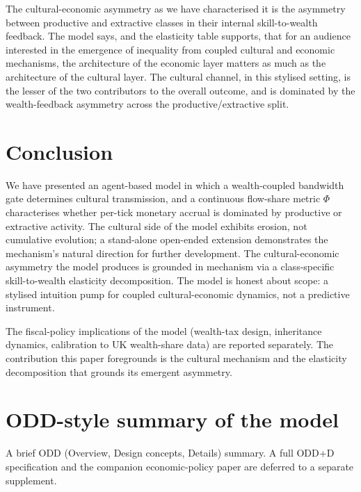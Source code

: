\documentclass[11pt]{article}
\begin{document}
The cultural-economic asymmetry as we have characterised it is the
asymmetry between productive and extractive classes in their
internal skill-to-wealth feedback. The model says, and the
elasticity table supports, that for an audience interested in the
emergence of inequality from coupled cultural and economic
mechanisms, the architecture of the economic layer matters as much
as the architecture of the cultural layer. The cultural channel,
in this stylised setting, is the lesser of the two contributors to
the overall outcome, and is dominated by the wealth-feedback
asymmetry across the productive/extractive split.

\section{Conclusion}

We have presented an agent-based model in which a wealth-coupled
bandwidth gate determines cultural transmission, and a continuous
flow-share metric $\Phi$ characterises whether per-tick monetary
accrual is dominated by productive or extractive activity. The
cultural side of the model exhibits erosion, not cumulative
evolution; a stand-alone open-ended extension demonstrates the
mechanism's natural direction for further development. The
cultural-economic asymmetry the model produces is grounded in
mechanism via a class-specific skill-to-wealth elasticity
decomposition. The model is honest about scope: a stylised
intuition pump for coupled cultural-economic dynamics, not a
predictive instrument.

The fiscal-policy implications of the model (wealth-tax design,
inheritance dynamics, calibration to UK wealth-share data) are
reported separately. The contribution this paper foregrounds is
the cultural mechanism and the elasticity decomposition that
grounds its emergent asymmetry.




\appendix
\section{ODD-style summary of the model}
\label{app:odd}

A brief ODD (Overview, Design concepts, Details) summary. A full
ODD+D specification and the companion economic-policy paper are
deferred to a separate supplement.
\end{document}
